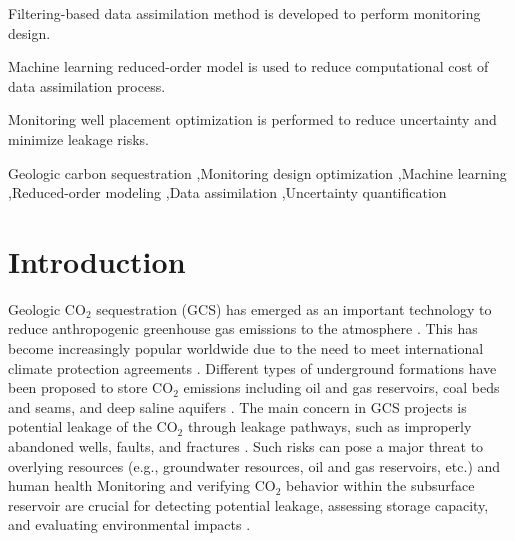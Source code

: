 \documentclass[a4paper,fleqn]{cas-sc}
\begin{document}
\begin{highlights}
\item Filtering-based data assimilation method is developed to perform monitoring design.
\item Machine learning reduced-order model is used to reduce computational cost of data assimilation process.
\item Monitoring well placement optimization is performed to reduce uncertainty and minimize leakage risks.

\end{highlights}

\begin{keywords}
Geologic carbon sequestration \sep Monitoring design optimization \sep Machine learning \sep Reduced-order modeling \sep Data assimilation \sep Uncertainty quantification
\end{keywords}


\maketitle

\section{Introduction}
Geologic CO$_2$ sequestration (GCS) has emerged as an important technology to reduce anthropogenic greenhouse gas emissions to the atmosphere \citep{Metz2005,Michael2010,Kopp2010867, Goodman2013329, Castelletto2013570, Li2015389, Levine201681, krevorCCS2018}. This has become increasingly popular worldwide due to the need to meet international climate protection agreements \citep{Energy20202010EuropeanCommission, Unitednations2015AgreementP}. Different types of underground formations have been proposed to store CO$_2$ emissions including oil and gas reservoirs, coal beds and seams, and deep saline aquifers \citep{Dai2016CO2Sites}. The main concern in GCS projects is potential leakage of the CO$_2$ through leakage pathways, such as improperly abandoned wells, faults, and fractures \citep{Metz2005, Harp2016150, Song2012, Sifuentes2009148, Nordbotten2012234}. Such risks can pose a major threat to overlying resources (e.g., groundwater resources, oil and gas reservoirs, etc.) and human health \citep{Benson2003, Keating2016319} Monitoring and verifying CO$_2$ behavior within the subsurface reservoir are crucial for detecting potential leakage, assessing storage capacity, and evaluating environmental impacts \citep{Condor20114036, DeLary201550, Li2016249}.
\end{document}
